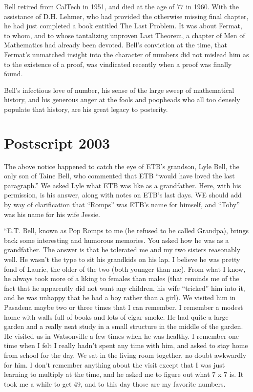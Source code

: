 \documentclass{article}
\begin{document}
Bell retired from CalTech in 1951, and died at the age of 77 in 1960. With the assistance of D.H. Lehmer, who had
provided the otherwise missing final chapter, he had just completed a book entitled The Last Problem. It was about
Fermat, to whom, and to whose tantalizing unproven Last Theorem, a chapter of Men of Mathematics had already been
devoted. Bell’s conviction at the time, that Fermat’s unmatched insight into the character of numbers did not mislead
him as to the existence of a proof, was vindicated recently when a proof was finally found. 

Bell’s infectious love of number, his sense of the large sweep of mathematical history, and his generous anger at the
fools and poopheads who all too densely populate that history, are his great legacy to posterity. 

\section[Postscript 2003]{Postscript 2003}
The above notice happened to catch the eye of ETB’s grandson, Lyle Bell, the only son of Taine Bell, who commented that
ETB “would have loved the last paragraph.” We asked Lyle what ETB was like as a grandfather. Here, with his permission,
is his answer, along with notes on ETB’s last days. WE should add by way of clarification that “Romps” was ETB’s name
for himself, and “Toby” was his name for his wife Jessie. 

“E.T. Bell, known as Pop Romps to me (he refused to be called Grandpa), brings back some interesting and humorous
memories. You asked how he was as a grandfather. The answer is that he tolerated me and my two sisters reasonably well.
He wasn’t the type to sit his grandkids on his lap. I believe he was pretty fond of Laurie, the older of the two (both
younger than me). From what I know, he always took more of a liking to females than males (that reminds me of the fact
that he apparently did not want any children, his wife “tricked” him into it, and he was unhappy that he had a boy
rather than a girl). We visited him in Pasadena maybe two or three times that I can remember. I remember a modest home
with walls full of books and lots of cigar smoke. He had quite a large garden and a really neat study in a small
structure in the middle of the garden. He visited us in Watsonville a few times when he was healthy. I remember one
time when I felt I really hadn’t spent any time with him, and asked to stay home from school for the day. We sat in the
living room together, no doubt awkwardly for him. I don’t remember anything about the visit except that I was just
learning to multiply at the time, and he asked me to figure out what 7 x 7 is. It took me a while to get 49, and to
this day those are my favorite numbers. 
\end{document}
